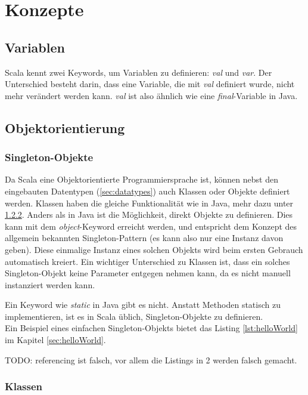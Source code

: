 \chapter{Konzepte}

\section{Variablen}

Scala kennt zwei Keywords, um Variablen zu definieren: \emph{val} und 
\emph{var}. Der Unterschied besteht darin, dass eine Variable, die mit
\emph{val} definiert wurde, nicht mehr verändert werden kann. \emph{val}
ist also ähnlich wie eine \emph{final}-Variable in Java.

\section{Objektorientierung}

\subsection{Singleton-Objekte}

Da Scala eine Objektorientierte Programmiersprache ist, können nebst
den eingebauten Datentypen (\ref{sec:datatypes}) auch Klassen oder
Objekte definiert werden. Klassen haben die gleiche Funktionalität
wie in Java, mehr dazu unter \ref{sec:classes}.  Anders als in Java
ist die Möglichkeit, direkt Objekte zu definieren.  Dies kann mit dem
\emph{object}-Keyword erreicht werden, und entspricht dem Konzept des
allgemein bekannten Singleton-Pattern (es kann also nur eine Instanz davon
geben). Diese einmalige Instanz eines solchen Objekts wird beim ersten
Gebrauch automatisch kreiert. Ein wichtiger Unterschied zu Klassen ist,
dass ein solches Singleton-Objekt keine Parameter entgegen nehmen kann,
da es nicht manuell instanziert werden kann.

Ein Keyword wie \emph{static} in Java gibt es nicht. Anstatt Methoden
statisch zu implementieren, ist es in Scala üblich, Singleton-Objekte
zu definieren.\\

Ein Beispiel eines einfachen Singleton-Objekts bietet das Listing
\ref{lst:helloWorld} im Kapitel \ref{sec:helloWorld}.

TODO: referencing ist falsch, vor allem die Listings in 2 werden falsch gemacht.

\subsection{Klassen}
\label{sec:classes}

